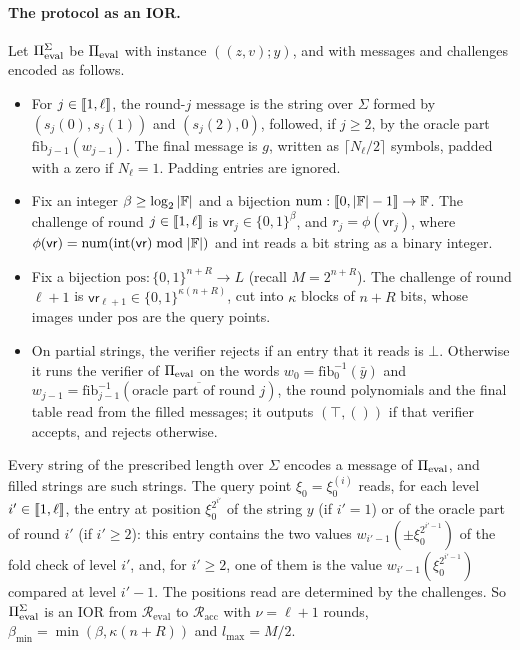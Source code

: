 \paragraph{The protocol as an IOR.}
Let $\Pi_{\mathrm{eval}}^{\Sigma}$ be $\Pi_{\mathrm{eval}}$ with instance $((z,v); y)$, and with messages and challenges encoded as follows.
\begin{itemize}
  \item For $j \in \llbracket 1, \ell \rrbracket$, the round-$j$ message is the string over $\Sigma$ formed by $(s_j(0), s_j(1))$ and $(s_j(2), 0)$, followed, if $j \ge 2$, by the oracle part $\mathrm{fib}_{j-1}(w_{j-1})$. The final message is $g$, written as $\lceil N_\ell/2 \rceil$ symbols, padded with a zero if $N_\ell = 1$. Padding entries are ignored.
  \item Fix an integer $\beta \ge \log_2 |\mathbb{F}|$ and a bijection $\mathrm{num} : \llbracket 0, |\mathbb{F}|-1 \rrbracket \to \mathbb{F}$. The challenge of round $j \in \llbracket 1, \ell \rrbracket$ is $\mathsf{vr}_j \in \{0,1\}^\beta$, and $r_j = \phi(\mathsf{vr}_j)$, where $\phi(\mathsf{vr}) = \mathrm{num}(\mathrm{int}(\mathsf{vr}) \bmod |\mathbb{F}|)$ and $\mathrm{int}$ reads a bit string as a binary integer.
  \item Fix a bijection $\mathrm{pos} : \{0,1\}^{n+R} \to L$ (recall $M = 2^{n+R}$). The challenge of round $\ell+1$ is $\mathsf{vr}_{\ell+1} \in \{0,1\}^{\kappa(n+R)}$, cut into $\kappa$ blocks of $n+R$ bits, whose images under $\mathrm{pos}$ are the query points.
  \item On partial strings, the verifier rejects if an entry that it reads is $\bot$. Otherwise it runs the verifier of $\Pi_{\mathrm{eval}}$ on the words $w_0 = \mathrm{fib}_0^{-1}(\bar y)$ and $w_{j-1} = \mathrm{fib}_{j-1}^{-1}(\overline{\text{oracle part of round } j})$, the round polynomials and the final table read from the filled messages; it outputs $(\top, ())$ if that verifier accepts, and rejects otherwise.
\end{itemize}
Every string of the prescribed length over $\Sigma$ encodes a message of $\Pi_{\mathrm{eval}}$, and filled strings are such strings.
The query point $\xi_0 = \xi^{(i)}_0$ reads, for each level $i' \in \llbracket 1, \ell \rrbracket$, the entry at position $\xi_0^{2^{i'}}$ of the string $y$ (if $i' = 1$) or of the oracle part of round $i'$ (if $i' \ge 2$): this entry contains the two values $w_{i'-1}(\pm\xi_0^{2^{i'-1}})$ of the fold check of level $i'$, and, for $i' \ge 2$, one of them is the value $w_{i'-1}(\xi_0^{2^{i'-1}})$ compared at level $i'-1$.
The positions read are determined by the challenges.
So $\Pi_{\mathrm{eval}}^{\Sigma}$ is an IOR from $\mathcal{R}_{\mathrm{eval}}$ to $\mathcal{R}_{\mathrm{acc}}$ with $\nu = \ell + 1$ rounds, $\beta_{\min} = \min(\beta, \kappa(n+R))$ and $l_{\max} = M/2$.

